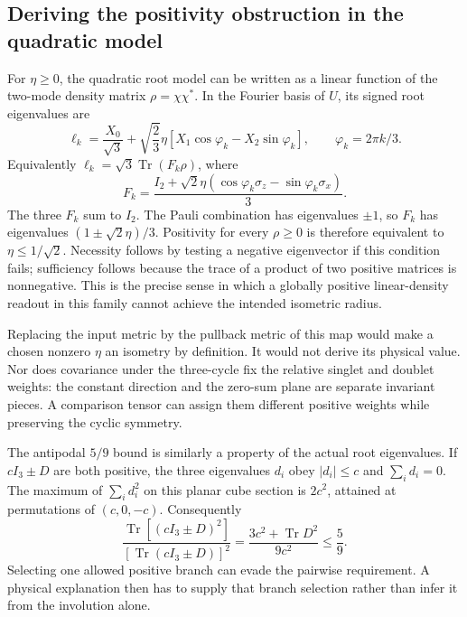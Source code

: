\subsection{Deriving the positivity obstruction in the quadratic model}
For $\eta\geq0$, the quadratic root model can be written as a linear function of the
two-mode density matrix $\rho=\chi\chi^*$. In the Fourier basis of
$U$, its signed root eigenvalues are
\begin{equation}
 \ell_k=\frac{X_0}{\sqrt3}
 +\sqrt{\frac23}\eta[X_1\cos\varphi_k-X_2\sin\varphi_k],
 \qquad \varphi_k=2\pi k/3.
\end{equation}
Equivalently $\ell_k=\sqrt3\operatorname{Tr}(F_k\rho)$, where
\begin{equation}
 F_k=\frac{I_2+\sqrt2\eta(\cos\varphi_k\sigma_z-
                               \sin\varphi_k\sigma_x)}{3}.
\end{equation}
The three $F_k$ sum to $I_2$. The Pauli combination has eigenvalues
$\pm1$, so $F_k$ has eigenvalues $(1\pm\sqrt2\eta)/3$.
Positivity for every $\rho\geq0$ is therefore equivalent to
$\eta\leq1/\sqrt2$. Necessity follows by testing a negative
eigenvector if this condition fails; sufficiency follows because
the trace of a product of two positive matrices is nonnegative.
This is the precise sense in which a globally positive linear-density
readout in this family cannot achieve the intended isometric radius.

Replacing the input metric by the pullback metric of this map would
make a chosen nonzero $\eta$ an isometry by definition. It would
not derive its physical value. Nor does covariance under the three-cycle
fix the relative singlet and doublet weights: the constant direction
and the zero-sum plane are separate invariant pieces. A comparison
tensor can assign them different positive weights while preserving
the cyclic symmetry.

The antipodal $5/9$ bound is similarly a property of the actual
root eigenvalues. If $cI_3\pm D$ are both positive, the three
eigenvalues $d_i$ obey $|d_i|\leq c$ and $\sum_i d_i=0$.
The maximum of $\sum_i d_i^2$ on this planar cube section is
$2c^2$, attained at permutations of $(c,0,-c)$. Consequently
\begin{equation}
 \frac{\operatorname{Tr}[(cI_3\pm D)^2]}
      {[\operatorname{Tr}(cI_3\pm D)]^2}
 =\frac{3c^2+\operatorname{Tr}D^2}{9c^2}\leq\frac59.
\end{equation}
Selecting one allowed positive branch can evade the pairwise
requirement. A physical explanation then has to supply that branch
selection rather than infer it from the involution alone.

